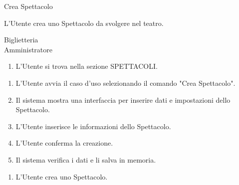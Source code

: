 
\renewcommand{\attori}{Biglietteria \\ Amministratore}


{\ucTable	%
{	%
	Crea Spettacolo
	
}{	%
	
}{	%
	L'Utente crea uno Spettacolo da svolgere nel teatro.
	
}{	%
	\attori
	
}{	%
	\begin{enumerate}
        \item L'Utente si trova nella sezione SPETTACOLI.
    \end{enumerate}
	
}{	%
	\begin{enumerate}
        \item L'Utente avvia il caso d'uso selezionando il comando "Crea Spettacolo".
        \item Il sistema mostra una interfaccia per inserire dati e impostazioni dello Spettacolo.
        \item L'Utente inserisce le informazioni dello Spettacolo.
        \item L'Utente conferma la creazione.
        \item Il sistema verifica i dati e li salva in memoria.
    \end{enumerate}
	
}{	%
	\begin{enumerate}
        \item L'Utente crea uno Spettacolo.
    \end{enumerate}
	
}{	%
} }


